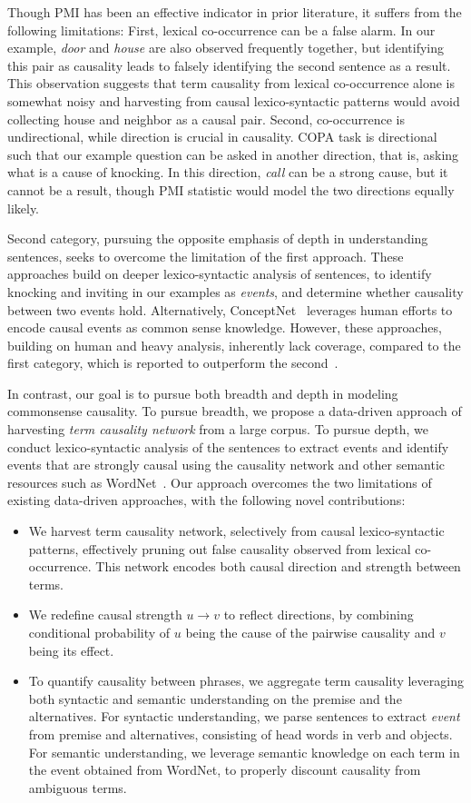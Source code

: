 Though PMI has been an effective indicator in prior literature, it suffers from the following limitations:
First, lexical co-occurrence can be a false alarm. In our example,
\emph{door} and \emph{house} are also observed
frequently together, but identifying this pair as causality leads to falsely identifying the second sentence as a
result. This observation suggests that term causality from lexical co-occurrence alone is somewhat noisy and
harvesting from causal lexico-syntactic patterns would avoid collecting
house and neighbor as a causal pair.
Second, co-occurrence is undirectional, while direction is crucial in causality.
COPA task is directional such that our example question can be asked in another direction, that is, asking what is a cause of knocking.
In this direction, \emph{call} can be a strong cause, but it cannot
be a result, though PMI statistic would model
the two directions equally likely.

Second category, pursuing the opposite emphasis of depth in
understanding sentences, seeks to overcome the limitation of
the first approach.
These approaches build on deeper lexico-syntactic analysis of sentences,
to identify knocking and inviting in our examples as
\emph{events}, and determine whether causality between two events hold.
Alternatively, ConceptNet~\cite{HavasiSALAM10} leverages human efforts
to encode causal events as common sense knowledge.
However, these approaches, building on human and heavy analysis,
inherently lack coverage, compared to the first category, which is
reported to outperform the second~\cite{gordon2012copa}.

In contrast, our goal is to pursue both breadth and depth in modeling
commonsense causality.
To pursue breadth, we propose a data-driven approach of harvesting
\emph{term causality network} from a large corpus.
To pursue depth, we conduct lexico-syntactic analysis of the sentences to
extract events and identify events that are strongly causal using the causality network
and other semantic resources such as WordNet~\cite{Miller1995}.
Our approach overcomes the two limitations of existing data-driven approaches,
with the following novel contributions:
\begin{itemize}
\item We harvest term causality network, selectively from causal
lexico-syntactic patterns, effectively pruning out false causality observed
from lexical co-occurrence.
This network encodes both causal direction and strength between terms.
\item We redefine causal strength $u \rightarrow v$ to reflect directions, by combining conditional probability
of $u$ being the cause of the pairwise causality and $v$ being its effect.
\item To quantify causality between phrases, we aggregate term causality
leveraging both syntactic and semantic understanding on the premise
and the alternatives. For syntactic understanding, we parse sentences to
extract \emph{event} from premise and alternatives, consisting of head words
in verb and objects. For semantic understanding, we leverage
semantic knowledge on each term in the event obtained from WordNet,
to properly discount causality from ambiguous terms.
\end{itemize}

